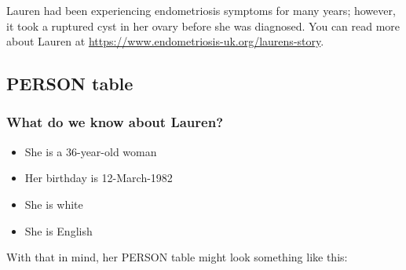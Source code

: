 \documentclass[11pt]{book}
\providecommand{\tightlist}{%
  \setlength{\itemsep}{0pt}\setlength{\parskip}{0pt}}
\theoremstyle{definition}
\theoremstyle{definition}
\theoremstyle{definition}
\theoremstyle{remark}
\begin{document}
Lauren had been experiencing endometriosis symptoms for many years; however, it took a ruptured cyst in her ovary before she was diagnosed. You can read more about Lauren at \url{https://www.endometriosis-uk.org/laurens-story}.

\hypertarget{person}{%
\subsection{PERSON table}\label{person}}

\hypertarget{what-do-we-know-about-lauren}{%
\subsubsection*{What do we know about Lauren?}\label{what-do-we-know-about-lauren}}

\begin{itemize}
\tightlist
\item
  She is a 36-year-old woman
\item
  Her birthday is 12-March-1982
\item
  She is white
\item
  She is English
\end{itemize}

With that in mind, her PERSON table might look something like this:
\end{document}
